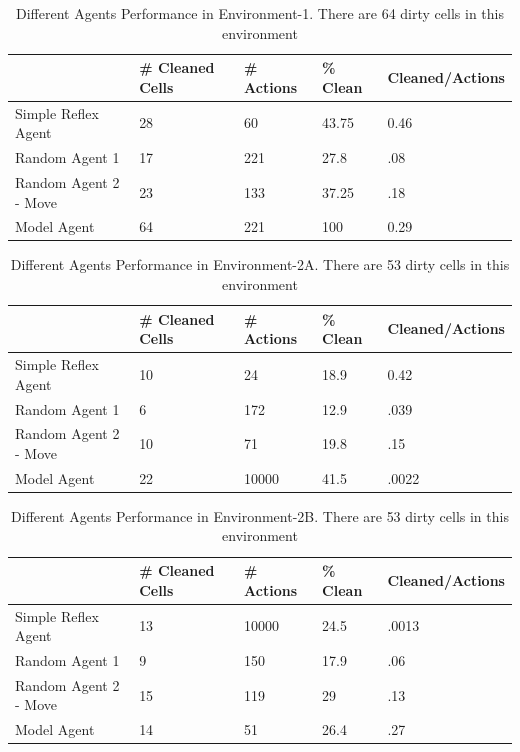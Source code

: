 \documentclass{article}
\begin{document}
\begin{table}[h!]
\centering
\caption{Different Agents Performance in Environment-1. There are 64 dirty cells in this environment}
\label{my-label}
\begin{tabular}{l|ll|ll}
\hline
                    & \# Cleaned Cells & \# Actions  & \% Clean & Cleaned/Actions \\ \hline
Simple Reflex Agent 		& 28                  & 60                  & 43.75     & 0.46            \\ \hline
Random Agent 1       	& 17          	& 221                & 27.8       & .08            \\ 
Random Agent 2 - Move 	& 23 			& 133		&37.25	& .18			\\ \hline
Model Agent 		& 64                  & 221                & 100       & 0.29            \\ \hline
\end{tabular}
\end{table}




\begin{table}[h!]
\centering
\caption{Different Agents Performance in Environment-2A. There are 53 dirty cells in this environment}
\label{my-label}
\begin{tabular}{l|ll|ll}
\hline
                    & \# Cleaned Cells & \# Actions  & \% Clean & Cleaned/Actions \\ \hline
Simple Reflex Agent 		& 10                  & 24                  & 18.9     & 0.42            \\ \hline
Random Agent 1       	& 6	         	& 172                & 12.9       & .039            \\ 
Random Agent 2 - Move 	& 10 			& 71		& 19.8	& .15			\\ \hline
Model Agent 		& 22                  & 10000                & 41.5       & .0022            \\ \hline
\end{tabular}
\end{table}

\begin{table}[h!]
\centering
\caption{Different Agents Performance in Environment-2B. There are 53 dirty cells in this environment}
\label{my-label}
\begin{tabular}{l|ll|ll}
\hline
                    & \# Cleaned Cells & \# Actions  & \% Clean & Cleaned/Actions \\ \hline
Simple Reflex Agent 		& 13                  & 10000                  & 24.5     & .0013            \\ \hline
Random Agent 1       	& 9	         	& 150                & 17.9       & .06            \\ 
Random Agent 2 - Move 	& 15 			& 119		& 29 	& .13			\\ \hline
Model Agent 		& 14                  & 51                & 26.4       & .27            \\ \hline
\end{tabular}
\end{table}
\end{document}
